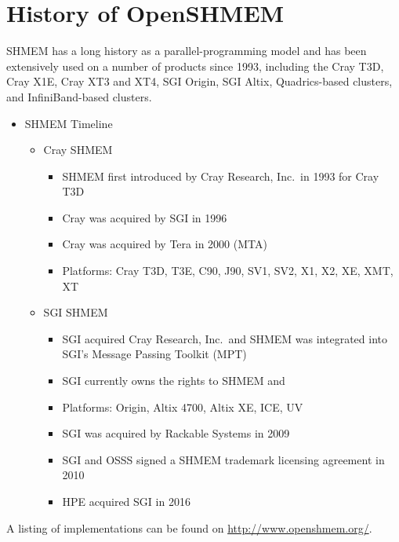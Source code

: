 \chapter{History of OpenSHMEM}\label{sec:openshmem_history}

SHMEM has a long history as a parallel-programming model and has been
extensively used on a number of products since 1993, including the Cray T3D,
Cray X1E, Cray XT3 and XT4, \ac{SGI} Origin, \ac{SGI} Altix, Quadrics-based
clusters, and InfiniBand-based clusters.

\begin{itemize}
\item SHMEM Timeline
  \begin{itemize}
  \item Cray SHMEM
    \begin{itemize}
    \item SHMEM first introduced by Cray Research, Inc.\ in 1993 for Cray T3D
    \item Cray was acquired by \ac{SGI} in 1996
    \item Cray was acquired by Tera in 2000 (MTA)
    \item Platforms: Cray T3D, T3E, C90, J90, SV1, SV2, X1, X2, XE, XMT, XT
    \end{itemize}
  \item \ac{SGI} SHMEM
    \begin{itemize}
    \item \ac{SGI} acquired Cray Research, Inc.\ and SHMEM was integrated into
      \ac{SGI}'s Message Passing Toolkit (MPT)
    \item \ac{SGI} currently owns the rights to SHMEM and \openshmem
    \item Platforms: Origin, Altix 4700, Altix XE, ICE, UV
    \item \ac{SGI} was acquired by Rackable Systems in 2009
    \item \ac{SGI} and \ac{OSSS} signed a
      SHMEM trademark licensing agreement in 2010
    \item \ac{HPE} acquired {SGI} in 2016
    \end{itemize}
  \end{itemize}
\end{itemize}

A listing of \openshmem implementations can be found on
\url{http://www.openshmem.org/}.








